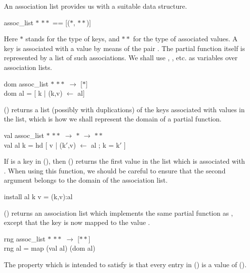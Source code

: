 An association list provides us with a suitable data structure.
\begin{mlcoded}
    assoc\_list $\ast$ $\ast\ast$ == [($\ast$, $\ast\ast$)]
\end{mlcoded}
Here $\ast$ stands for the type of keys, and $\ast\ast$ for the type of associated values. A
key  is associated with a value  by means of the pair . The partial
function itself is represented by a list of such associations. We shall use , ,
etc. as variables over association lists.
\begin{mlcoded}
    dom \hastype{} assoc\_list $\ast$ $\ast\ast$ $\rightarrow$ [$\ast$]\\
    dom al = [ k | (k,v) $\leftarrow$ al]
\end{mlcoded}
() returns a list (possibly with duplications) of the keys associated with
values in the list, which is how we shall represent the domain of a partial
function.
\begin{mlcoded}
    val \hastype{} assoc\_list $\ast$ $\ast\ast$ $\rightarrow$ $\ast$ $\rightarrow$ $\ast\ast$ \\
    val al k = hd [ v | (k$'$,v) $\leftarrow$ al ; k = k$'$ ]
\end{mlcoded}
If  is a key in (), then () returns the first value in the list which is
associated with . When using this function, we should be careful to ensure
that the second argument belongs to the domain of the association list.
\begin{mlcoded}
    install al k v = (k,v):al
\end{mlcoded}
() returns an association list which implements the same partial
function as , except that the key  is now mapped to the value .
\begin{mlcoded}
    rng \hastype{} assoc\_list $\ast$ $\ast\ast$ $\rightarrow$ [$\ast\ast$]\\
    rng al = map (val al) (dom al)
\end{mlcoded}
The property which  is intended to satisfy is that every entry in () is a
value of ().

